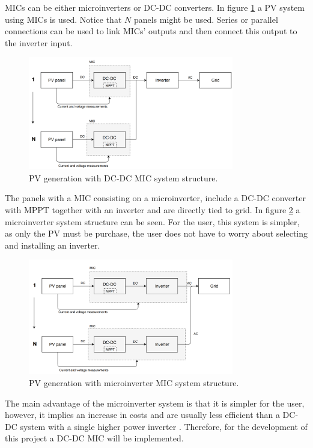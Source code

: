MICs can be either microinverters or DC-DC converters. In figure \ref{MIC_dcdc} a PV system using MICs is used. Notice that $N$ panels might be used. Series or parallel connections can be used to link MICs' outputs and then connect this output to the inverter input.

\begin{figure}[H]
	\begin{center}
		\includegraphics[width=0.8\textwidth]{../Pictures/MIC_dcdc}
		\caption{PV generation with DC-DC MIC system structure.}
		\label{MIC_dcdc}
	\end{center}	
\end{figure}

The panels with a MIC consisting on a microinverter, include a DC-DC converter with MPPT together with an inverter and are directly tied to grid. In figure \ref{microinverter_system} a microinverter system structure can be seen. For the user, this system is simpler, as only the PV must be purchase, the user does not have to worry about selecting and installing an inverter. 

\begin{figure}[H]
	\begin{center}
	\includegraphics[width=0.8\textwidth]{../Pictures/MIC_microinverter}
		\caption{PV generation with microinverter MIC system structure.}
		\label{microinverter_system}
	\end{center}	
\end{figure}

The main advantage of the microinverter system is that it is simpler for the user, however, it implies an increase in costs and are usually less efficient than a DC-DC system with a single higher power inverter \cite{ArchitectureMIC}. Therefore, for the development of this project a DC-DC MIC will be implemented.